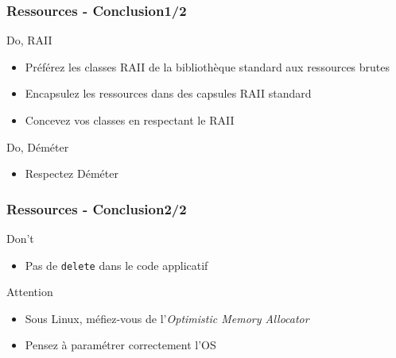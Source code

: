 \documentclass[C++.tex]{subfiles}
\begin{document}
\begin{frame}
	\frametitle{Ressources - Conclusion\titlehfill{}1/2}
	\begin{exampleblock}{Do, RAII}
		\begin{itemize}
			\item Préférez les classes RAII de la bibliothèque standard aux ressources brutes
			\item Encapsulez les ressources dans des capsules RAII standard
			\item Concevez vos classes en respectant le RAII
		\end{itemize}
	\end{exampleblock}

	\begin{exampleblock}{Do, Déméter}
		\begin{itemize}
			\item Respectez Déméter
		\end{itemize}
	\end{exampleblock}
\end{frame}

\begin{frame}
	\frametitle{Ressources - Conclusion\titlehfill{}2/2}
	\begin{alertblock}{Don't}
		\begin{itemize}
			\item Pas de \lstinline|delete| dans le code applicatif
		\end{itemize}

	\end{alertblock}

	\begin{alertblock}{Attention}
		\begin{itemize}
			\item Sous Linux, méfiez-vous de l'\textit{Optimistic Memory Allocator}


			\item Pensez à paramétrer correctement l'OS
		\end{itemize}
	\end{alertblock}
\end{frame}
\end{document}
